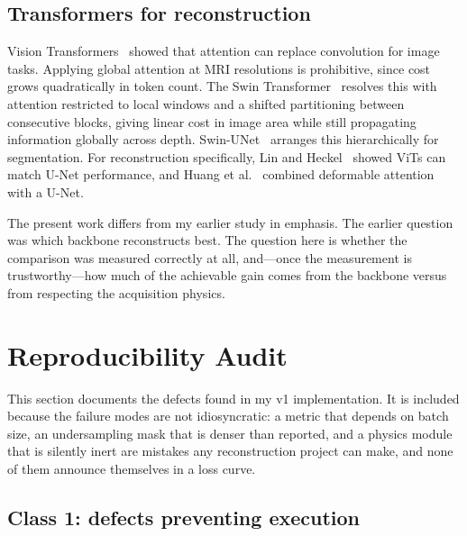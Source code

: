 \documentclass[11pt]{article}
\begin{document}
\subsection{Transformers for reconstruction}

Vision Transformers~\cite{dosovitskiy2020} showed that attention can replace
convolution for image tasks. Applying global attention at MRI resolutions is
prohibitive, since cost grows quadratically in token count. The Swin
Transformer~\cite{liu2021} resolves this with attention restricted to local
windows and a shifted partitioning between consecutive blocks, giving linear
cost in image area while still propagating information globally across depth.
Swin-UNet~\cite{cao2021} arranges this hierarchically for segmentation. For
reconstruction specifically, Lin and Heckel~\cite{lin2022} showed ViTs can match
U-Net performance, and Huang et al.~\cite{huang2022} combined deformable
attention with a U-Net.

The present work differs from my earlier study in emphasis. The earlier question
was which backbone reconstructs best. The question here is whether the
comparison was measured correctly at all, and---once the measurement is
trustworthy---how much of the achievable gain comes from the backbone versus
from respecting the acquisition physics.

\section{Reproducibility Audit}
\label{sec:audit}

This section documents the defects found in my v1 implementation. It is
included because the failure modes are not idiosyncratic: a metric that depends
on batch size, an undersampling mask that is denser than reported, and a
physics module that is silently inert are mistakes any reconstruction project
can make, and none of them announce themselves in a loss curve.

\subsection{Class 1: defects preventing execution}
\end{document}

